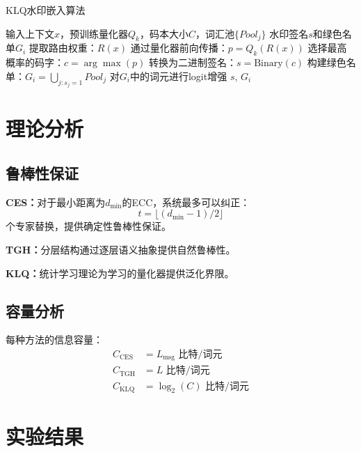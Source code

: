 \documentclass[letterpaper,twocolumn,10pt]{article}
\begin{document}
\begin{algorithm}[h]
\caption{KLQ水印嵌入算法}
\begin{algorithmic}[1]
\REQUIRE 输入上下文$x$，预训练量化器$Q_k$，码本大小$C$，词汇池$\{Pool_j\}$
\ENSURE 水印签名$s$和绿色名单$G_i$
\STATE 提取路由权重：$R(x)$
\STATE 通过量化器前向传播：$p = Q_k(R(x))$
\STATE 选择最高概率的码字：$c = \arg\max(p)$
\STATE 转换为二进制签名：$s = \text{Binary}(c)$
\STATE 构建绿色名单：$G_i = \bigcup_{j: s_j=1} Pool_j$
\STATE 对$G_i$中的词元进行logit增强
\RETURN $s$, $G_i$
\end{algorithmic}
\end{algorithm}

\section{理论分析}

\subsection{鲁棒性保证}

\textbf{CES：}对于最小距离为$d_{\min}$的ECC，系统最多可以纠正：
\begin{equation}
t = \lfloor(d_{\min}-1)/2\rfloor
\end{equation}
个专家替换，提供确定性鲁棒性保证。

\textbf{TGH：}分层结构通过逐层语义抽象提供自然鲁棒性。

\textbf{KLQ：}统计学习理论为学习的量化器提供泛化界限。

\subsection{容量分析}

每种方法的信息容量：
\begin{align}
C_{\text{CES}} &= L_{\text{msg}} \text{ 比特/词元} \\
C_{\text{TGH}} &= L \text{ 比特/词元} \\
C_{\text{KLQ}} &= \log_2(C) \text{ 比特/词元}
\end{align}

\section{实验结果}
\end{document}
